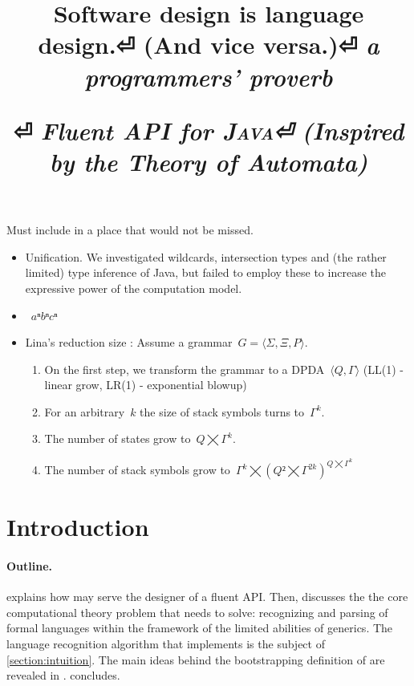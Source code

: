 \documentclass[nonatbib,preprint,numbers]{sigplanconf}
\title{%
\begin{flushright}
  \scriptsize\bfseries
  Software design is language design.⏎
    (And vice versa.)⏎
  \footnotesize\mdseries\itshape
   a programmers' proverb
\end{flushright}
  \Huge \Fajita⏎
  \huge \itshape \textbf Fluent \textbf API for \textsc{\textbf Java}⏎
  \LARGE (\textbf Inspired by the \textbf Theory of \textbf Automata)
}
\begin{document}
\maketitle

\begin{abstract}
  
\end{abstract}

Must include in a place that would not be missed.
\begin{itemize}
  \item \Prolog Unification. We investigated wildcards, intersection types and
    (the rather limited) type inference of Java, but failed to employ these to
    increase the expressive power of the computation model.
        \item~$aⁿbⁿcⁿ$
  \item Lina's reduction size : Assume a grammar~$G=⟨Σ,Ξ, P⟩$.
    \begin{enumerate}
      \item On the first step, we transform the grammar to a DPDA~$⟨Q,Γ⟩$
        (LL(1) - linear grow, LR(1) - exponential blowup)
      \item For an arbitrary~$k$ the size of stack symbols turns to~$Γ^k$.
      \item The number of states grow to~$Q⨉Γ^k$.
      \item The number of stack symbols grow to~$Γ^k⨉(Q²⨉Γ^{2k})^{Q⨉Γ^k}$
    \end{enumerate}

\end{itemize}

\section{Introduction}


\paragraph{Outline.}

  explains how \Fajita may serve the designer of a fluent API.
Then,  discusses the
  the core computational theory problem that \Fajita
  needs to solve: recognizing and parsing of formal languages
  within the framework of the limited abilities of \Java
  generics.
The language recognition algorithm that \Fajita
  implements is the subject of \cref{section:intuition}.
The main ideas behind the bootstrapping definition of \Self
  are revealed in .
 concludes.
\end{document}
